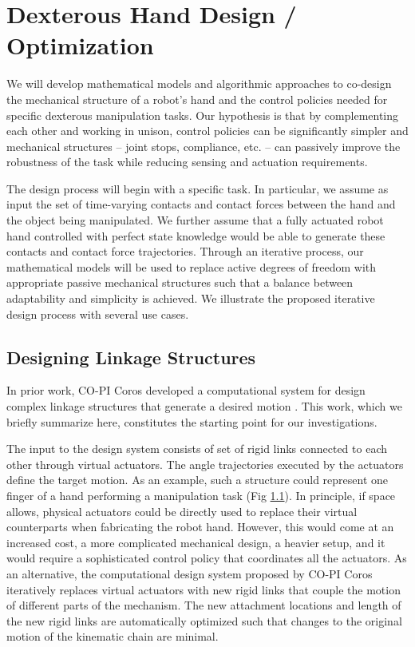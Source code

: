 \section{Dexterous Hand Design / Optimization}


We will develop mathematical models and algorithmic approaches to co-design the mechanical structure of a robot's hand and the control policies needed for specific dexterous manipulation tasks. Our hypothesis is that by complementing each other and working in unison, control policies can be significantly simpler and mechanical structures -- joint stops, compliance, etc. -- can passively improve the robustness of the task while reducing sensing and actuation requirements. 

The design process will begin with a specific task. In particular, we assume as input the set of time-varying contacts and contact forces between the hand and the object being manipulated. We further assume that a fully actuated robot hand controlled with perfect state knowledge would be able to generate these contacts and contact force trajectories. Through an iterative process, our mathematical models will be used to replace active degrees of freedom with appropriate passive mechanical structures such that a balance between adaptability and simplicity is achieved. We illustrate the proposed iterative design process with several use cases.

\subsection{Designing Linkage Structures}

In prior work, CO-PI Coros developed a computational system for design complex linkage structures that generate a desired motion \cite{}. This work, which we briefly summarize here, constitutes the starting point for our investigations.

The input to the design system consists of set of rigid links connected to each other through virtual actuators. The angle trajectories executed by the actuators define the target motion. As an example, such a structure could represent one finger of a hand performing a manipulation task (Fig \ref{}). In principle, if space allows, physical actuators could be directly used to replace their virtual counterparts when fabricating the robot hand. However, this would come at an increased cost, a more complicated mechanical design, a heavier setup, and it would require a sophisticated control policy that coordinates all the actuators. As an alternative, the computational design system proposed by CO-PI Coros iteratively replaces virtual actuators with new rigid links that couple the motion of different parts of the mechanism. The new attachment locations and length of the new rigid links are automatically optimized such that changes to the original motion of the kinematic chain are minimal.

